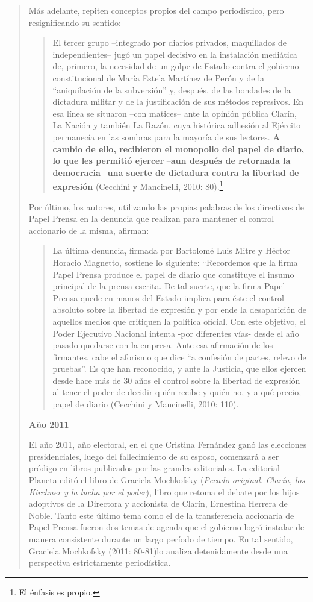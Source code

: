 {\begin{quote}
Más adelante, repiten conceptos propios del campo periodístico, pero resignificando su sentido:

\begin{quote}
El tercer grupo --integrado por diarios privados, maquillados de independientes-- jugó un papel decisivo en la instalación mediática de, primero, la necesidad de un golpe de Estado contra el gobierno constitucional de María Estela Martínez de Perón y de la \enquote{aniquilación de la subversión} y, después, de las bondades de la dictadura militar y de la justificación de sus métodos represivos. En esa línea se situaron --con matices-- ante la opinión pública Clarín, La Nación y también La Razón, cuya histórica adhesión al Ejército permanecía en las sombras para la mayoría de sus lectores. \textbf{A cambio de ello, recibieron el monopolio del papel de diario, lo que les permitió ejercer} --\textbf{aun después de retornada la democracia}-- \textbf{una suerte de dictadura contra la libertad de expresión} (Cecchini y Mancinelli, 2010: 80).\footnote{El énfasis es propio.}
\end{quote}

Por último, los autores, utilizando las propias palabras de los directivos de Papel Prensa en la denuncia que realizan para mantener el control accionario de la misma, afirman:

\begin{quote}
La última denuncia, firmada por Bartolomé Luis Mitre y Héctor Horacio Magnetto, sostiene lo siguiente: ``Recordemos que la firma Papel Prensa produce el papel de diario que constituye el insumo principal de la prensa escrita. De tal suerte, que la firma Papel Prensa quede en manos del Estado implica para éste el control absoluto sobre la libertad de expresión y por ende la desaparición de aquellos medios que critiquen la política oficial. Con este objetivo, el Poder Ejecutivo Nacional intenta -por diferentes vías- desde el año pasado quedarse con la empresa. Ante esa afirmación de los firmantes, cabe el aforismo que dice \enquote{a confesión de partes, relevo de pruebas}. Es que han reconocido, y ante la Justicia, que ellos ejercen desde hace más de 30 años el control sobre la libertad de expresión al tener el poder de decidir quién recibe y quién no, y a qué precio, papel de diario (Cecchini y Mancinelli, 2010: 110).
\end{quote}

\textbf{Año 2011}

El año 2011, año electoral, en el que Cristina Fernández ganó las elecciones presidenciales, luego del fallecimiento de su esposo, comenzará a ser pródigo en libros publicados por las grandes editoriales. La editorial Planeta editó el libro de Graciela Mochkofsky (\emph{Pecado original. Clarín, los Kirchner y la lucha por el poder}), libro que retoma el debate por los hijos adoptivos de la Directora y accionista de Clarín, Ernestina Herrera de Noble. Tanto este último tema como el de la transferencia accionaria de Papel Prensa fueron dos temas de agenda que el gobierno logró instalar de manera consistente durante un largo período de tiempo. En tal sentido, Graciela Mochkofsky (2011: 80-81)lo analiza detenidamente desde una perspectiva estrictamente periodística.


\end{quote}}
